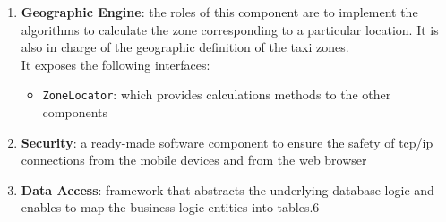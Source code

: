 \begin{enumerate}
\begin{itemize}
	\end{itemize}
	\item \textbf{Geographic Engine}: the roles of this component are to implement the algorithms to calculate the zone corresponding to a particular location. It is also in charge of the geographic definition of the taxi zones.\\It exposes the following interfaces:
	\begin{itemize}
		\item \texttt{ZoneLocator}: which provides calculations methods to the other components
	\end{itemize}
	\item \textbf{Security}: a ready-made software component to ensure the safety of tcp/ip connections from the mobile devices and from the web browser
	\item \textbf{Data Access}: framework that abstracts the underlying database logic and enables to map the business logic entities into tables.6
\end{enumerate}